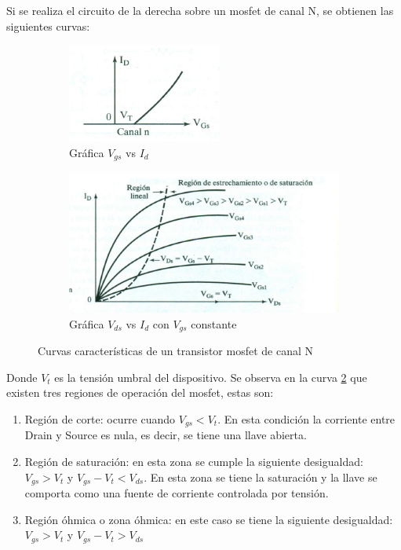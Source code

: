 Si se realiza el circuito de la derecha sobre un mosfet de canal N, se obtienen las siguientes curvas:

\begin{figure}[ht]
	\begin{subfigure}{0.5\linewidth}
		\includegraphics[width=\linewidth]{curva_1_mosf}
		\caption{Gráfica $V_{gs}$ vs $ I_d$}
	\end{subfigure}
	\hfil
	\begin{subfigure}{0.5\linewidth}
		\includegraphics[scale=0.75]{curva_2_mosf}
		\caption{Gráfica $V_{ds}$ vs $ I_d$ con $V_{gs}$ constante}
		\label{fig:vds_vs_id_mosfetop}	
	\end{subfigure}
\caption{Curvas características de un transistor mosfet de canal N}
\end{figure}

Donde $V_t$ es la tensión umbral del dispositivo. Se observa en la curva \ref{fig:vds_vs_id_mosfetop} que existen tres regiones de operación del mosfet, estas son:
\begin{enumerate}
	\item Región de corte: ocurre cuando $V_{gs}<V_t$. En esta condición la corriente entre Drain y Source es nula, es decir, se tiene una llave abierta.
	\item  Región de saturación: en esta zona se cumple la siguiente desigualdad: $V_{gs}>V_t$ y $V_{gs}-V_{t}<V_{ds}$. En esta zona se tiene la saturación y la llave se comporta como una fuente de corriente controlada por tensión. 
	\item Región óhmica o zona óhmica: en este caso se tiene la siguiente desigualdad: $V_{gs}>V_t$ y $V_{gs}-V_t>V_{ds}$
\end{enumerate} 

